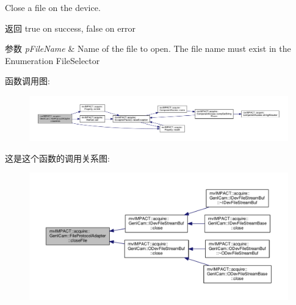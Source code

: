 Close a file on the device. 

\begin{DoxyReturn}{返回}
true on success, false on error 
\end{DoxyReturn}

\begin{DoxyParams}{参数}
{\em p\+File\+Name} & Name of the file to open. The file name must exist in the Enumeration File\+Selector \\
\hline
\end{DoxyParams}


函数调用图\+:
\nopagebreak
\begin{figure}[H]
\begin{center}
\leavevmode
\includegraphics[width=350pt]{classmv_i_m_p_a_c_t_1_1acquire_1_1_gen_i_cam_1_1_file_protocol_adapter_a89f55f99f0e20b79d2d7258f04fc5804_cgraph}
\end{center}
\end{figure}




这是这个函数的调用关系图\+:
\nopagebreak
\begin{figure}[H]
\begin{center}
\leavevmode
\includegraphics[width=350pt]{classmv_i_m_p_a_c_t_1_1acquire_1_1_gen_i_cam_1_1_file_protocol_adapter_a89f55f99f0e20b79d2d7258f04fc5804_icgraph}
\end{center}
\end{figure}


